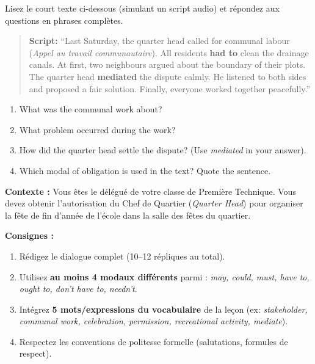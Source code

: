 \documentclass[11pt]{article}
\newcommand{\cle}[1]{{\popxbold\color{popdark}#1}}
\newcounter{popsec}
\newcounter{popsub}
\newcommand{\courssub}[1]{%
  \stepcounter{popsub}%
  \par\vspace{9pt}\noindent{\popxbold\fontsize{11.5}{13}\selectfont\color{popink}{\color{poporange}\thepopsec.\thepopsub}\hspace{6pt}#1}\par\nopagebreak\vspace{4pt}
}
\begin{document}
\begin{exercice}
Lisez le court texte ci-dessous (simulant un script audio) et répondez aux questions en phrases complètes.

\begin{quote}
\textbf{Script:} ``Last Saturday, the quarter head called for \cle{communal labour} (\emph{Appel au travail communautaire}). All residents \textbf{had to} clean the drainage canals. At first, two neighbours argued about the boundary of their plots. The quarter head \textbf{mediated} the dispute calmly. He listened to both sides and proposed a fair solution. Finally, everyone worked together peacefully.''
\end{quote}

\begin{enumerate}
\item What was the communal work about?
\item What problem occurred during the work?
\item How did the quarter head settle the dispute? (Use \emph{mediated} in your answer).
\item Which modal of obligation is used in the text? Quote the sentence.
\end{enumerate}
\end{exercice}

\courssub{Je me prépare au Bac}

\begin{exercice}
\textbf{Contexte :} Vous êtes le délégué de votre classe de Première Technique. Vous devez obtenir l'autorisation du Chef de Quartier (\emph{Quarter Head}) pour organiser la fête de fin d'année de l'école dans la salle des fêtes du quartier.

\textbf{Consignes :}
\begin{enumerate}
\item Rédigez le dialogue complet (10--12 répliques au total).
\item Utilisez \textbf{au moins 4 modaux différents} parmi : \emph{may, could, must, have to, ought to, don't have to, needn't}.
\item Intégrez \textbf{5 mots/expressions du vocabulaire} de la leçon (ex: \emph{stakeholder, communal work, celebration, permission, recreational activity, mediate}).
\item Respectez les conventions de politesse formelle (salutations, formules de respect).
\end{enumerate}
\end{exercice}
\end{document}
